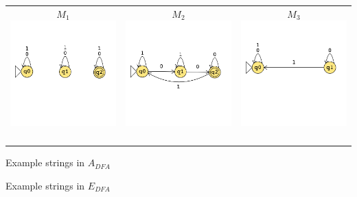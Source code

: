 \documentclass[12pt, oneside]{article}
\begin{document}
    \begin{center}
    \begin{tabular}{|c|c|c|}
    \hline
    $M_1$  \includegraphics[width=2in]{../../resources/machines/Lect17DFA1.png} &  
    $M_2$ \includegraphics[width=2in]{../../resources/machines/Lect17DFA2.png} &  
    $M_3$ \includegraphics[width=2in]{../../resources/machines/Lect17DFA3.png} \\ 
    && \\
    && \\
    && \\
    && \\
    \hline
    \end{tabular}
    \end{center}
    
    Example strings in $A_{DFA}$
    
    \vfill
    
    Example strings in  $E_{DFA}$
    
    \vfill
    
\end{document}
